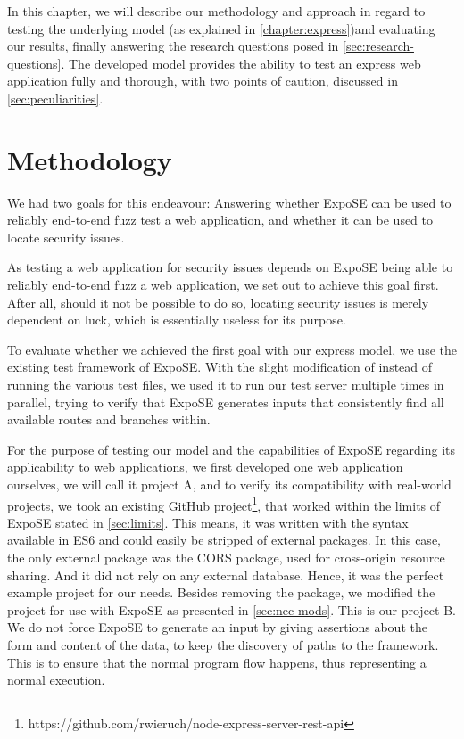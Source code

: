 In this chapter, we will describe our methodology and approach in regard to testing the underlying model (as explained in \autoref{chapter:express})and evaluating our results, finally answering the research questions posed in \autoref{sec:research-questions}. 
The developed model provides the ability to test an express web application fully and thorough, with two points of caution, discussed in \autoref{sec:peculiarities}.

\section{Methodology} 
We had two goals for this endeavour: Answering whether ExpoSE can be used to reliably end-to-end fuzz test a web application, and whether it can be used to locate security issues.

As testing a web application for security issues depends on ExpoSE being able to reliably end-to-end fuzz a web application, we set out to achieve this goal first. After all, should it not be possible to do so, locating security issues is merely dependent on luck, which is essentially useless for its purpose. 

To evaluate whether we achieved the first goal with our express model, we use the existing test framework of ExpoSE. With the slight modification of instead of running the various test files, we used it to run our test server multiple times in parallel, trying to verify that ExpoSE generates inputs that consistently find all available routes and branches within.


For the purpose of testing our model and the capabilities of ExpoSE regarding its applicability to web applications, we first developed one web application ourselves, we will call it project A, and to verify its compatibility with real-world projects, we took an existing GitHub project\footnote{https://github.com/rwieruch/node-express-server-rest-api}, that worked within the limits of ExpoSE stated in \autoref{sec:limits}. This means, it was written with the syntax available in ES6 and could easily be stripped of external packages. In this case, the only external package was the CORS package, used for cross-origin resource sharing. And it did not rely on any external database. Hence, it was the perfect example project for our needs. Besides removing the package, we modified the project for use with ExpoSE as presented in \autoref{sec:nec-mods}. This is our project B.
We do not force ExpoSE to generate an input by giving assertions about the form and content of the data, to keep the discovery of paths to the framework. This is to ensure that the normal program flow happens, thus representing a normal execution. 

